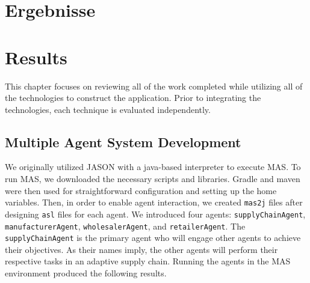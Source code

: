 {\chapter{Ergebnisse}}
{\chapter{Results}}

\label{sec:results}

This chapter focuses on reviewing all of the work completed while utilizing all of the technologies to construct the application. Prior to integrating the technologies, each technique is evaluated independently.

\section{Multiple Agent System Development}

We originally utilized JASON with a java-based interpreter to execute \ac{MAS}. To run \ac{MAS}, we downloaded the necessary scripts and libraries. Gradle and maven were then used for straightforward configuration and setting up the home variables. Then, in order to enable agent interaction, we created \texttt{mas2j} files after designing \texttt{asl} files for each agent. We introduced four agents: \texttt{supplyChainAgent}, \texttt{manufacturerAgent}, \texttt{wholesalerAgent}, and \texttt{retailerAgent}. The \texttt{supplyChainAgent} is the primary agent who will engage other agents to achieve their objectives. As their names imply, the other agents will perform their respective tasks in an adaptive supply chain. Running the agents in the \ac{MAS} environment produced the following results.

\vspace{.5cm}

